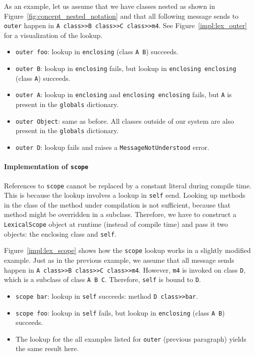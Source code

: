 As an example, let us assume that we have classes nested as shown in Figure~\ref{fig:concept_nested_notation} and that all following message sends to \texttt{outer} happen in \texttt{A class>>B class>>C class>>m4}. See Figure~\ref{impl:lex_outer} for a visualization of the lookup.
\begin{itemize}
	\item \texttt{outer foo}: lookup in \texttt{enclosing} (class \texttt{A B}) succeeds.
	\item \texttt{outer B}: lookup in \texttt{enclosing} fails, but lookup in \texttt{enclosing enclosing} (class \texttt{A}) succeeds.
	\item \texttt{outer A}: lookup in \texttt{enclosing} and \texttt{enclosing enclosing} fails, but \texttt{A} is present in the \texttt{globals} dictionary.
	\item \texttt{outer Object}: same as before. All classes outside of our system are also present in the \texttt{globals} dictionary.
	\item \texttt{outer D}: lookup fails and raises a \texttt{MessageNotUnderstood} error.
\end{itemize}

\paragraph{Implementation of \texttt{scope}}
References to \texttt{scope} cannot be replaced by a constant literal during compile time. This is because the lookup involves a lookup in \texttt{self} send. Looking up methods in the class of the method under compilation is not sufficient, because that method might be overridden in a subclass. Therefore, we have to construct a \texttt{LexicalScope} object at runtime (instead of compile time) and pass it two objects: the enclosing class and \texttt{self}.

Figure~\ref{impl:lex_scope} shows how the \texttt{scope} lookup works in a slightly modified example. Just as in the previous example, we assume that all message sends happen in \texttt{A class>>B class>>C class>>m4}. However, \texttt{m4} is invoked on class \texttt{D}, which is a subclass of class \texttt{A B C}. Therefore, \texttt{self} is bound to \texttt{D}.

\begin{itemize}
	\item \texttt{scope bar}: lookup in \texttt{self} succeeds: method \texttt{D class>>bar}.
	\item \texttt{scope foo}: lookup in \texttt{self} fails, but lookup in \texttt{enclosing} (class \texttt{A B}) succeeds.
	\item The lookup for the all examples listed for \texttt{outer} (previous paragraph) yields the same result here.
\end{itemize}

